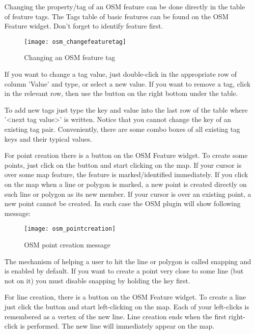 
Changing the property/tag of an OSM feature can be done directly in
the table of feature tags. The Tags table of basic features can be found
on the OSM Feature widget. Don't forget to identify feature first.

\begin{figure}[ht]
   \centering
   \texttt{[image: osm\_changefeaturetag]}
   \caption{Changing an OSM feature tag \nixcaption}\label{fig:osmchfeattag}
\end{figure}

If you want to change a tag value, just double-click in the appropriate row of
column 'Value' and type, or select a new value. If you want to remove a tag,
click in the relevant row, then use the button  on the right
bottom under the table.

To add new tags just type the key and value into the last row of the table
where '<next tag value>' is written. Notice that you cannot change the key of
an existing tag pair. Conveniently, there are some combo boxes of all
existing tag keys and their typical values.


For point creation there is a 
button on the OSM Feature widget. To create some points, just click on the
button and start clicking on the map. If your cursor is over some map
feature, the feature is marked/identified immediately. If you click on
the map when a line or polygon is marked, a new point is created directly on
such line or polygon as its new member. If your cursor is over an existing
point, a new point cannot be created. In such case the OSM plugin will show
following message:

\begin{figure}[ht]
   \centering
   \texttt{[image: osm\_pointcreation]}
   \caption{OSM point creation message \nixcaption}\label{fig:osmpoicreat}
\end{figure}

The mechanism of helping a user to hit the line or polygon is called snapping
and is enabled by default. If you want to create a point very close to some
line (but not on it) you must disable snapping by holding the
 key first.


For line creation, there is a  button
on the OSM Feature widget. To create a line just click the button and start
left-clicking on the map. Each of your left-clicks is remembered as a 
vertex of the new line. Line creation ends when the first right-click is performed.
The new line will immediately appear on the map.

